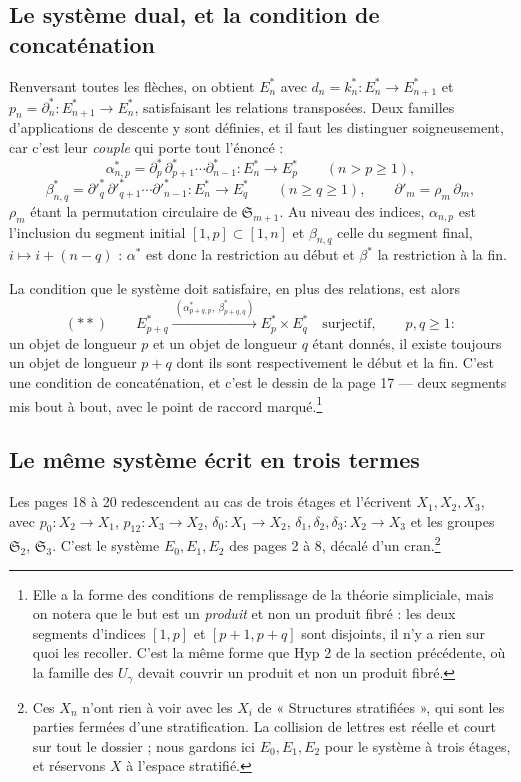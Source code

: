 \documentclass[11pt,a4paper]{article}
\begin{document}
\subsection*{Le système dual, et la condition de concaténation}

Renversant toutes les flèches, on obtient $E^{*}_{n}$ avec
$d_{n} = k^{*}_{n} \colon E^{*}_{n} \to E^{*}_{n+1}$ et
$p_{n} = \partial^{*}_{n} \colon E^{*}_{n+1} \to E^{*}_{n}$, satisfaisant les
relations transposées. Deux familles d'applications de descente y sont
définies, et il faut les distinguer soigneusement, car c'est leur \emph{couple}
qui porte tout l'énoncé :
\[
  \alpha^{*}_{n,p} = \partial^{*}_{p}\,\partial^{*}_{p+1}\cdots\partial^{*}_{n-1}
  \colon E^{*}_{n} \longrightarrow E^{*}_{p} \qquad (n > p \geq 1),
\]
\[
  \beta^{*}_{n,q} = \partial'^{*}_{q}\,\partial'^{*}_{q+1}\cdots\partial'^{*}_{n-1}
  \colon E^{*}_{n} \longrightarrow E^{*}_{q} \qquad (n \geq q \geq 1),
  \qquad \partial'_{m} = \rho_{m}\,\partial_{m},
\]
$\rho_{m}$ étant la permutation circulaire de $\mathfrak{S}_{m+1}$. Au niveau
des indices, $\alpha_{n,p}$ est l'inclusion du segment initial
$[1,p] \subset [1,n]$ et $\beta_{n,q}$ celle du segment final, $i \mapsto
i + (n-q)$ : $\alpha^{*}$ est donc la restriction au début et $\beta^{*}$ la
restriction à la fin.

La condition que le système doit satisfaire, en plus des relations, est alors
\[
  (**) \qquad
  E^{*}_{p+q} \xrightarrow{\ (\alpha^{*}_{p+q,p},\ \beta^{*}_{p+q,q})\ }
  E^{*}_{p} \times E^{*}_{q} \quad \text{surjectif}, \qquad p,q \geq 1 :
\]
un objet de longueur $p$ et un objet de longueur $q$ étant donnés, il existe
toujours un objet de longueur $p+q$ dont ils sont respectivement le début et la
fin. C'est une condition de concaténation, et c'est le dessin de la page 17 —
deux segments mis bout à bout, avec le point de raccord
marqué.\footnote{Elle a la forme des conditions de remplissage de la théorie
simpliciale, mais on notera que le but est un \emph{produit} et non un produit
fibré : les deux segments d'indices $[1,p]$ et $[p+1,p+q]$ sont disjoints, il
n'y a rien sur quoi les recoller. C'est la même forme que Hyp 2 de la section
précédente, où la famille des $U_{\gamma}$ devait couvrir un produit et non un
produit fibré.}

\subsection*{Le même système écrit en trois termes}

Les pages 18 à 20 redescendent au cas de trois étages et l'écrivent
$X_{1}, X_{2}, X_{3}$, avec $p_{0} \colon X_{2} \to X_{1}$,
$p_{12} \colon X_{3} \to X_{2}$, $\delta_{0} \colon X_{1} \to X_{2}$,
$\delta_{1},\delta_{2},\delta_{3} \colon X_{2} \to X_{3}$ et les groupes
$\mathfrak{S}_{2}$, $\mathfrak{S}_{3}$. C'est le système
$E_{0}, E_{1}, E_{2}$ des pages 2 à 8, décalé d'un
cran.\footnote{Ces $X_{n}$ n'ont rien à voir avec les $X_{i}$ de
« Structures stratifiées », qui sont les parties fermées d'une stratification.
La collision de lettres est réelle et court sur tout le dossier ; nous gardons
ici $E_{0}, E_{1}, E_{2}$ pour le système à trois étages, et réservons $X$ à
l'espace stratifié.}
\end{document}
